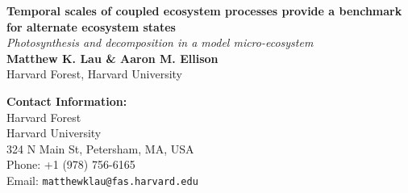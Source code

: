 \documentclass[a0,landscape]{a0poster}
\begin{document}




\begin{minipage}[b]{0.65\linewidth}
\veryHuge \color{Red} \textbf{Temporal scales of coupled ecosystem
  processes provide a benchmark for alternate ecosystem states}
\color{Black}\\ %
\Huge\textit{Photosynthesis and decomposition in a model micro-ecosystem}\\[1cm] %
\huge \textbf{Matthew K. Lau \& Aaron M. Ellison}\\ %
\huge Harvard Forest, Harvard University \\ %
\end{minipage}
%
\begin{minipage}[b]{0.20\linewidth}
\color{DarkSlateGray}\Large \textbf{Contact Information:}\\ 
Harvard Forest\\ %
Harvard University\\ 324 N Main St, Petersham, MA, USA\\ 
Phone: +1 (978) 756-6165\\ %
Email: \texttt{matthewklau@fas.harvard.edu}\\ %
\end{minipage}
%
\end{document}
